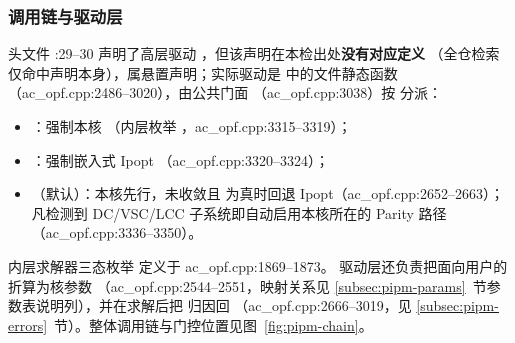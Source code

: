\subsubsection*{调用链与驱动层}
头文件 :29--30 声明了高层驱动
，但该声明在本检出处\textbf{没有对应定义}
（全仓检索仅命中声明本身），属悬置声明；实际驱动是
 中的文件静态函数 
（ac\_opf.cpp:2486--3020），由公共门面 
（ac\_opf.cpp:3038）按  分派：
\begin{itemize}
  \item {}：强制本核
        （内层枚举 ，ac\_opf.cpp:3315--3319）；
  \item {}：强制嵌入式 Ipopt
        （ac\_opf.cpp:3320--3324）；
  \item {}（默认）：本核先行，未收敛且 
        为真时回退 Ipopt（ac\_opf.cpp:2652--2663）；凡检测到 DC/VSC/LCC
        子系统即自动启用本核所在的 Parity 路径（ac\_opf.cpp:3336--3350）。
\end{itemize}
内层求解器三态枚举  定义于 ac\_opf.cpp:1869--1873。
驱动层还负责把面向用户的  折算为核参数
（ac\_opf.cpp:2544--2551，映射关系见
\ref{subsec:pipm-params}~节参数表说明列），并在求解后把 
归因回 （ac\_opf.cpp:2666--3019，见
\ref{subsec:pipm-errors}~节）。整体调用链与门控位置见图~\ref{fig:pipm-chain}。


